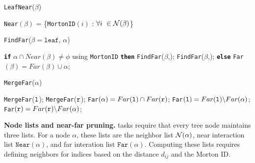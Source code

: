 \begin{algorithm}[!t]
\caption{{} \texttt{LeafNear}($\beta$)}
\begin{algorithmic}
  \STATE  \texttt{Near}$(\beta)$ = \{\texttt{MortonID}$(i)$ : $\forall i\ \in {\mathcal N}(\beta)$\}
\end{algorithmic}
\label{a:nearnear}
\end{algorithm}

\begin{algorithm}[!t]
  \caption{{} \texttt{FindFar}($\beta=\mathtt{leaf}$, $\alpha$)}
\begin{algorithmic}
  \STATE \texttt{\bf if} $\alpha \cap Near(\beta) \neq \phi$ using \texttt{MortonID} \texttt{\bf then}
  \STATE \gap \texttt{FindFar}($\beta$,\lc); \texttt{FindFar}($\beta$,\rc); 
  \STATE \texttt{\bf else} \texttt{Far}$(\beta) = Far(\beta) \cup \alpha$;
\end{algorithmic}
\label{a:nearfar}
\end{algorithm}

\begin{algorithm}[!t]
\caption{{} \texttt{MergeFar}($\alpha$)}
\begin{algorithmic}
  \STATE \texttt{MergeFar}(${\tt l}$); \texttt{MergeFar}(${\tt r}$);
  \STATE \texttt{Far}$(\alpha) = Far({\tt l}) \cap Far({\tt r})$; 
  \STATE \texttt{Far}$({\tt l}) = Far({\tt l}) \backslash Far(\alpha)$; \texttt{Far}$({\tt r}) = Far({\tt r}) \backslash Far(\alpha)$;
\end{algorithmic}
\label{a:farfar}
\end{algorithm}

\textbf{Node lists and near-far pruning.}
\gofmm{} tasks require that every tree node maintains three lists.
For a node $\alpha$, these lists are the neighbor list ${\mathcal N}(\alpha)$,
near interaction list $\mathtt{Near}(\alpha)$, and far interation list
$\mathtt{Far}(\alpha)$. Computing these lists requires
defining neighbors for indices based on the distance $d_{ij}$ 
and the Morton ID.


